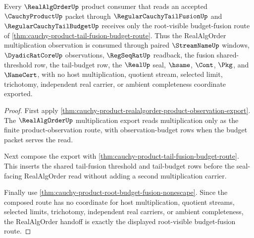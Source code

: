 \begin{theorem}
\label{thm:cauchy-product-realalgorder-root-handoff}
Every $\RealAlgOrderUp$ product consumer that reads an accepted $\CauchyProductUp$ packet through $\RegularCauchyTailFusionUp$ and $\RegularCauchyTailBudgetUp$ receives only the root-visible budget-fusion route of \autoref{thm:cauchy-product-tail-fusion-budget-route}. Thus the RealAlgOrder multiplication observation is consumed through paired $\StreamNameUp$ windows, $\DyadicRatCoreUp$ observations, $\RegSeqRatUp$ readback, the fusion shared-threshold row, the tail-budget row, the $\RealUp$ seal, $\hsame$, $\Cont$, $\Pkg$, and $\NameCert$, with no host multiplication, quotient stream, selected limit, trichotomy, independent real carrier, or ambient completeness coordinate exported.
\end{theorem}
\begin{proof}
First apply \autoref{thm:cauchy-product-realalgorder-product-observation-export}. The $\RealAlgOrderUp$ multiplication export reads multiplication only as the finite product-observation route, with observation-budget rows when the budget packet serves the read.

Next compose the export with \autoref{thm:cauchy-product-tail-fusion-budget-route}. This inserts the shared tail-fusion threshold and tail-budget rows before the seal-facing RealAlgOrder read without adding a second multiplication carrier.

Finally use \autoref{thm:cauchy-product-root-budget-fusion-nonescape}. Since the composed route has no coordinate for host multiplication, quotient streams, selected limits, trichotomy, independent real carriers, or ambient completeness, the RealAlgOrder handoff is exactly the displayed root-visible budget-fusion route.
\end{proof}

